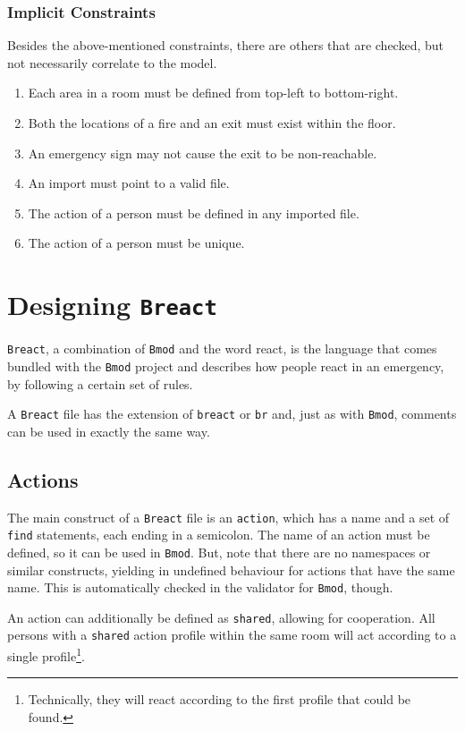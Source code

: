 \documentclass[review]{elsarticle}
\begin{document}
\subsubsection{Implicit Constraints}
Besides the above-mentioned constraints, there are others that are checked, but not necessarily correlate to the model.
\begin{enumerate}
	\item Each area in a room must be defined from top-left to bottom-right.
	\item Both the locations of a fire and an exit must exist within the floor.
	\item An emergency sign may not cause the exit to be non-reachable.
	\item An import must point to a valid file.
	\item The action of a person must be defined in any imported file.
	\item The action of a person must be unique.
\end{enumerate}

\section{Designing \texttt{Breact}}
\label{sec:breact}
\texttt{Breact}, a combination of \texttt{Bmod} and the word \textsf{react}, is the language that comes bundled with the \texttt{Bmod} project and describes how people react in an emergency, by following a certain set of rules.

A \texttt{Breact} file has the extension of \texttt{breact} or \texttt{br} and, just as with \texttt{Bmod}, comments can be used in exactly the same way.

\subsection{Actions}
The main construct of a \texttt{Breact} file is an \texttt{action}, which has a name and a set of \texttt{find} statements, each ending in a semicolon. The name of an action must be defined, so it can be used in \texttt{Bmod}. But, note that there are no namespaces or similar constructs, yielding in undefined behaviour for actions that have the same name. This is automatically checked in the validator for \texttt{Bmod}, though.

An action can additionally be defined as \texttt{shared}, allowing for cooperation. All persons with a \texttt{shared} action profile within the same room will act according to a single profile\footnote{Technically, they will react according to the first profile that could be found.}.
\end{document}
